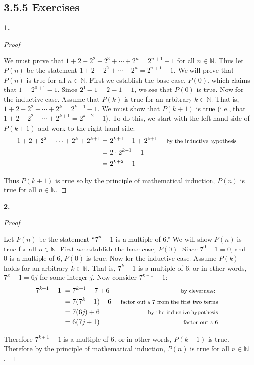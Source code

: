 \documentclass[10pt,]{book}
\theoremstyle{plain}
\theoremstyle{definition}
\theoremstyle{definition}
\theoremstyle{definition}
\numberwithin{equation}{chapter}
\def\N{\mathbb N}
\newcommand{\amp}{ & }
\begin{document}
\subsection*{3.5.5 Exercises}
\noindent\textbf{1.}\quad{}\begin{proof}\hypertarget{proof-19}{}

We must prove that \(1 + 2 + 2^2 + 2^3 + \cdots +2^n = 2^{n+1} - 1\) for all \(n \in \N\). Thus let \(P(n)\) be the statement \(1 + 2 + 2^2 + \cdots + 2^n = 2^{n+1} - 1\). We will prove that \(P(n)\) is true for all \(n \in \N\). First we establish the base case, \(P(0)\), which claims that \(1 = 2^{0+1} -1\). Since \(2^1 - 1 = 2 - 1 = 1\), we see that \(P(0)\) is true. Now for the inductive case. Assume that \(P(k)\) is true for an arbitrary \(k \in \N\). That is, \(1 + 2 + 2^2 + \cdots + 2^k = 2^{k+1} - 1\). We must show that \(P(k+1)\) is true (i.e., that \(1 + 2 + 2^2 + \cdots + 2^{k+1} = 2^{k+2} - 1\)). To do this, we start with the left hand side of \(P(k+1)\) and work to the right hand side:
\begin{align*}
  1 + 2 + 2^2 + \cdots + 2^k + 2^{k+1} = \amp ~ 2^{k+1} - 1 + 2^{k+1} \amp  \mbox{ \footnotesize by the inductive hypothesis}\\
  = \amp  ~2\cdot 2^{k+1} - 1 \amp\\
  = \amp ~ 2^{k+2} - 1 \amp
\end{align*}
%
\par

Thus \(P(k+1)\) is true so by the principle of mathematical induction, \(P(n)\) is true for all \(n \in \N\).
%
\end{proof}
\par\smallskip
\noindent\textbf{2.}\quad{}\begin{proof}\hypertarget{proof-20}{}

Let \(P(n)\) be the statement ``\(7^n - 1\) is a multiple of 6.'' We will show \(P(n)\) is true for all \(n \in \N\). First we establish the base case, \(P(0)\). Since \(7^0 - 1 = 0\), and \(0\) is a multiple of 6, \(P(0)\) is true. Now for the inductive case. Assume \(P(k)\) holds for an arbitrary \(k \in \N\). That is, \(7^k - 1\) is a multiple of 6, or in other words, \(7^k - 1 = 6j\) for some integer \(j\). Now consider \(7^{k+1} - 1\):
\begin{align*}
  7^{k+1} - 1 ~ \amp  = 7^{k+1} - 7 + 6 \amp  \mbox{ \footnotesize by cleverness: }\\
  \amp  = 7(7^k - 1) + 6 \amp  \mbox{ \footnotesize factor out a 7 from the first two terms}\\
  \amp  = 7(6j) + 6 \amp  \mbox{ \footnotesize by the inductive hypothesis}\\
  \amp  = 6(7j + 1) \amp  \mbox{ \footnotesize factor out a 6}
\end{align*}
%
\par

Therefore \(7^{k+1} - 1\) is a multiple of 6, or in other words, \(P(k+1)\) is true. Therefore by the principle of mathematical induction, \(P(n)\) is true for all \(n \in \N\).
%
\end{proof}
\end{document}
